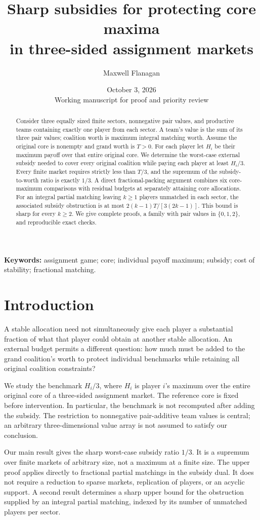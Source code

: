 \documentclass[11pt]{article}
\title{Sharp subsidies for protecting core maxima\\in three-sided assignment markets}
\author{Maxwell Flanagan}
\date{October 3, 2026\\[3pt]\small Working manuscript for proof and priority review}
\theoremstyle{remark}
\begin{document}
\maketitle

\begin{abstract}
Consider three equally sized finite sectors, nonnegative pair values, and
productive teams containing exactly one player from each sector. A team's
value is the sum of its three pair values; coalition worth is maximum integral
matching worth. Assume the original core is nonempty and grand worth is
$T>0$. For each player let $H_i$ be their maximum payoff over that entire
original core. We determine the worst-case external subsidy needed to cover
every original coalition while paying each player at least $H_i/3$.
Every finite market requires strictly less than $T/3$, and the supremum of
the subsidy-to-worth ratio is exactly $1/3$. A direct fractional-packing
argument combines six core-maximum comparisons with residual budgets at
separately attaining core allocations. For an integral partial matching
leaving $k\ge1$ players unmatched in each sector, the associated subsidy
obstruction is at most $2(k-1)T/[3(2k-1)]$. This bound is sharp for every
$k\ge2$. We give complete proofs, a family with pair values in
$\{0,1,2\}$, and reproducible exact checks.
\end{abstract}
\noindent\textbf{Keywords:} assignment game; core; individual payoff maximum;
subsidy; cost of stability; fractional matching.

\section{Introduction}
A stable allocation need not simultaneously give each player a substantial
fraction of what that player could obtain at another stable allocation.
An external budget permits a different question: how much must be added to
the grand coalition's worth to protect individual benchmarks while retaining
all original coalition constraints?

We study the benchmark $H_i/3$, where $H_i$ is player $i$'s maximum over the
entire original core of a three-sided assignment market. The reference core
is fixed before intervention. In particular, the benchmark is not recomputed
after adding the subsidy. The restriction to nonnegative pair-additive team
values is central; an arbitrary three-dimensional value array is not assumed
to satisfy our conclusion.

Our main result gives the sharp worst-case subsidy ratio $1/3$. It is a
supremum over finite markets of arbitrary size, not a maximum at a finite
size. The upper proof applies directly to fractional partial matchings in
the subsidy dual. It does not require a reduction to sparse markets,
replication of players, or an acyclic support. A second result determines a
sharp upper bound for the obstruction supplied by an integral partial
matching, indexed by its number of unmatched players per sector.
\end{document}
